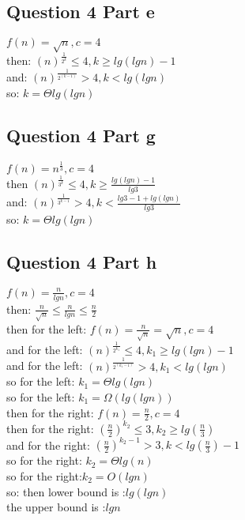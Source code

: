 \documentclass[paper=a4, fontsize=11pt]{scrartcl} %
\numberwithin{equation}{section} %
\numberwithin{figure}{section} %
\numberwithin{table}{section} %
\begin{document}
\subsection{Question 4 Part e}
$f(n)=\sqrt{n},c=4 $\\
then: $ (n)^{\frac{1}{2^k}} \leq 4,  k\geq lg(lgn)-1 $\\
and: $ (n)^{\frac{1}{2^(k-1)}} > 4, k< lg(lgn) $\\
so: $ k= \Theta lg(lg n) $

\subsection{Question 4 Part g}
$f(n)=n^{\frac{1}{3}},c=4$ \\
then $ (n)^{\frac{1}{3^k}} \leq 4, k\geq \frac{lg(lgn)-1}{lg3}$\\
and: $ (n)^{\frac{1}{3^{k-1}}} > 4, k< \frac{lg3-1+lg(lgn)}{lg3}$\\
so: $ k= \Theta lg(lg n) $

\subsection{Question 4 Part h}
$f(n)=\frac{n}{lgn},c=4$\\
then: $ \frac{n}{\sqrt n} \leq \frac{n}{lgn} \leq \frac{n}{2} $\\
then for the left: $f(n)=\frac{n}{\sqrt n}= \sqrt{n}, c=4  $\\
and for the left: $ (n)^{\frac{1}{2^{k_1}}} \leq 4,  k_1\geq lg(lgn)-1 $\\
and for the left: $ (n)^{\frac{1}{2^(k_1-1)}} > 4, k_1< lg(lgn) $\\
so for the left: $ k_1= \Theta lg(lg n) $ \\
so for the left: $k_1=\Omega(lg(lgn))$\\
then for the right:
$f(n)=\frac{n}{2},c=4$\\
then for the right: ${(\frac{n}{2})}^{k_2} \leq 3 , k_2 \geq lg(\frac{n}{3})$\\
and for the right: ${(\frac{n}{2})}^{k_2-1} > 3 , k < lg(\frac{n}{3})-1$\\
so for the right: $ k_2=\Theta lg(n) $\\
so for the right:$ k_2=O(lgn)$\\
so: then lower bound is :$lg(lgn) $\\
the upper bound is :$ lgn $
\end{document}
